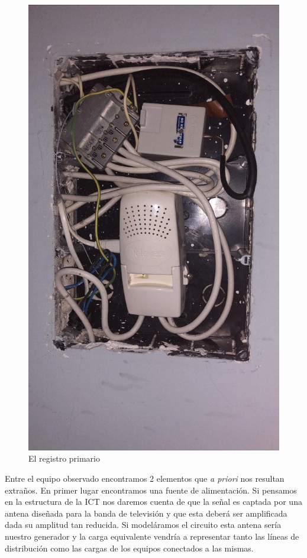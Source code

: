 \documentclass{article}[12 pt]
\begin{document}
		\begin{figure}
				\centering
				\includegraphics[scale=0.32, angle=90]{registro_primario.jpg}
				\caption{El registro primario}
				\label{f:reg_primario}
		\end{figure}

		Entre el equipo observado encontramos 2 elementos que \textit{a priori} nos resultan extraños. En primer lugar encontramos una fuente de alimentación. Si pensamos en la estructura de la ICT nos daremos cuenta de que la señal es captada por una antena diseñada para la banda de televisión y que esta deberá ser amplificada dada su amplitud tan reducida. Si modeláramos el circuito esta antena sería nuestro generador y la carga equivalente vendría a representar tanto las líneas de distribución como las cargas de los equipos conectados a las mismas.\\
\end{document}
